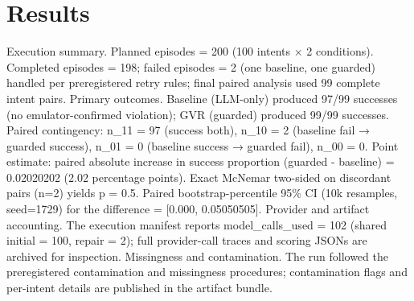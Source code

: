 \documentclass[conference]{IEEEtran}
\begin{document}
\section{Results}
Execution summary. Planned episodes = 200 (100 intents × 2 conditions). Completed episodes = 198; failed episodes = 2 (one baseline, one guarded) handled per preregistered retry rules; final paired analysis used 99 complete intent pairs. Primary outcomes. Baseline (LLM-only) produced 97/99 successes (no emulator-confirmed violation); GVR (guarded) produced 99/99 successes. Paired contingency: n\_11 = 97 (success both), n\_10 = 2 (baseline fail → guarded success), n\_01 = 0 (baseline success → guarded fail), n\_00 = 0. Point estimate: paired absolute increase in success proportion (guarded - baseline) = 0.02020202 (2.02 percentage points). Exact McNemar two-sided on discordant pairs (n=2) yields p = 0.5. Paired bootstrap-percentile 95\% CI (10k resamples, seed=1729) for the difference = [0.000, 0.05050505]. Provider and artifact accounting. The execution manifest reports model\_calls\_used = 102 (shared initial = 100, repair = 2); full provider-call traces and scoring JSONs are archived for inspection. Missingness and contamination. The run followed the preregistered contamination and missingness procedures; contamination flags and per-intent details are published in the artifact bundle.
\end{document}
